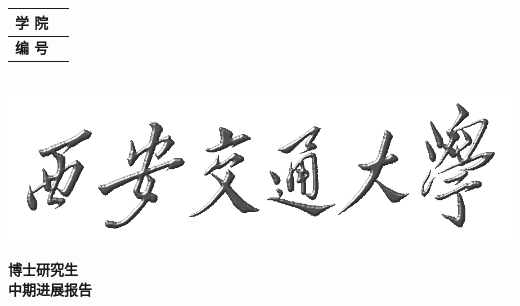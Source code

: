 \begin{center}
 \hskip 44mm
\begin{tabular}{|C{22mm}|C{34mm}|}
	\hline
	\parbox[c][8.2mm][c]{0pt}{}{\kai\bf\xiaosi 学\hspace*{7mm} 院} & {\kai\bf\xiaosi\institution} \\
	\hline
	\parbox[c][8.2mm][c]{0pt}{}{\kai\bf\xiaosi 编\hspace*{7mm} 号} & {\kai\bf\xiaosi\numberID} \\
	\hline
	\end{tabular}\\
\vspace{8mm}
\includegraphics[scale=0.31]{xjtu/xjtu2}
\vspace{3mm}

{\song\xiaochu\bf
博士研究生\\[6mm]
中期进展报告}
\vspace{35mm}


\end{center}
